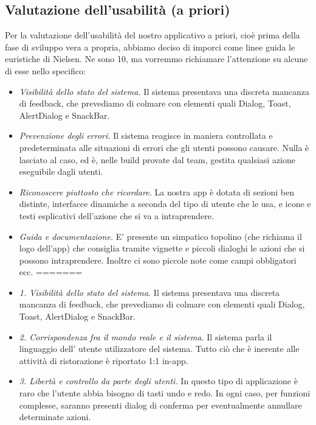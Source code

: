 \subsection{Valutazione dell'usabilità (a priori)}

    \begin{flushleft}
       Per la valutazione dell'usabilità del nostro applicativo a priori, cioè prima della fase di sviluppo vera a propria,
       abbiamo deciso di imporci come linee guida le euristiche di Nielsen.
       Ne sono 10, ma vorremmo richiamare l'attenzione su alcune di esse nello specifico:
        \begin{itemize}
<<<<<<< HEAD:Documentazione/capitoli/Documento dei requisiti software/Valutazione usabilità/Usabilità a priori.tex
            \item  \emph{Visibilità dello stato del sistema.} Il sistema presentava una discreta mancanza di feedback, che prevediamo di colmare con elementi quali Dialog, Toast, AlertDialog e SnackBar.
            \item  \emph{Prevenzione degli errori.} Il sistema reagisce in maniera controllata e predeterminata alle situazioni di errori che gli utenti possono causare. Nulla è lasciato al caso, ed è, nelle build provate dal team, gestita qualsiasi azione eseguibile dagli utenti.
            \item  \emph{Riconoscere piuttosto che ricordare.} La nostra app è dotata di sezioni ben distinte, interfacce dinamiche a seconda del tipo di utente che le usa, e icone e testi esplicativi dell'azione che si va a intraprendere.
            \item  \emph{Guida e documentazione.} E' presente un simpatico topolino (che richiama il logo dell'app) che consiglia tramite vignette e piccoli dialoghi le azioni che si possono intraprendere. Inoltre ci sono piccole note come campi obbligatori ecc.
=======
            \item  \emph{1. Visibilità dello stato del sistema.} Il sistema presentava una discreta mancanza di feedback, che prevediamo di colmare con elementi quali Dialog, Toast, AlertDialog e SnackBar.
            \item  \emph{2. Corrispondenza fra il mondo reale e il sistema.} Il sistema parla il linguaggio dell' utente utilizzatore del sistema. Tutto ciò che è inerente alle attività di ristorazione è riportato 1:1 in-app.
            \item  \emph{3. Libertà e controllo da parte degli utenti.} In questo tipo di applicazione è raro che l'utente abbia bisogno di tasti undo e redo. In ogni caso, per funzioni complesse, saranno presenti dialog di conferma per eventualmente annullare determinate azioni.

\end{itemize}
\end{flushleft}
